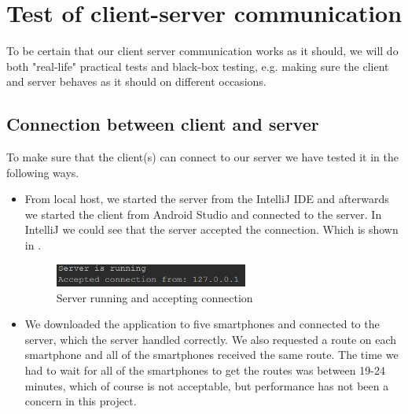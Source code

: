 \section{Test of client-server communication}
To be certain that our client server communication works as it should, we will do both "real-life" practical tests and black-box testing, e.g. making sure the client and server behaves as it should on different occasions.

\subsection{Connection between client and server}
To make sure that the client(s) can connect to our server we have tested it in the following ways.
\begin{itemize}
	\item From local host, we started the server from the IntelliJ IDE and afterwards we started the client from Android Studio and connected to the server. In IntelliJ we could see that the server accepted the connection. Which is shown in .
		\begin{figure}[h!]
  \centering
	    \includegraphics[width=0.6\textwidth]{figures/serverrunning.png}
    \caption{Server running and accepting connection}
    \label{fig:serverrunning}
\end{figure}
\end{itemize}
\begin{itemize}
	\item We downloaded the application to five smartphones and connected to the server, which the server handled correctly. We also requested a route on each smartphone and all of the smartphones received the same route. The time we had to wait for all of the smartphones to get the routes was between 19-24 minutes, which of course is not acceptable, but performance has not been a concern in this project.
\end{itemize}

